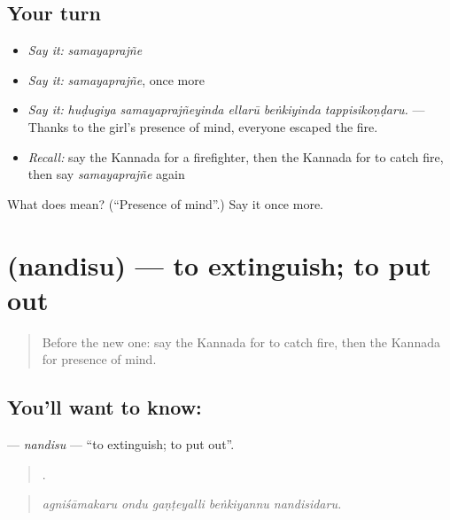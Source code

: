 \subsection*{Your turn}
\begin{itemize}
\raggedright
  \item \emph{Say it:} \emph{samayaprajñe}
  \item \emph{Say it:} \emph{samayaprajñe}, once more
  \item \emph{Say it:} \emph{huḍugiya samayaprajñeyinda ellarū beṅkiyinda tappisikoṇḍaru.} — Thanks to the girl's presence of mind, everyone escaped the fire.
  \item \emph{Recall:} say the Kannada for a firefighter, then the Kannada for to catch fire, then say \emph{samayaprajñe} again
\end{itemize}

\begin{tcolorbox}[breakable,colback=teal!4,colframe=teal!35!black,title={Before you move on}]
What does  mean? (\textquotedblleft{}Presence of mind\textquotedblright{}.) Say it once more.
\end{tcolorbox}
\section[\texorpdfstring{\kn{ನಂದಿಸು} (nandisu)}{ನಂದಿಸು (nandisu)}]{ (nandisu) — to extinguish; to put out}

\label{lesson:KA-C324-nandisu}



\begin{quote}
Before the new one: say the Kannada for to catch fire, then the Kannada for presence of mind.
\end{quote}

\subsection*{You'll want to know: }
\textbf{} — \emph{nandisu} — \textquotedblleft{}to extinguish; to put out\textquotedblright{}.

\begin{quote}
    .
\end{quote}

\begin{quote}
\emph{agniśāmakaru ondu gaṇṭeyalli beṅkiyannu nandisidaru.}
\end{quote}

